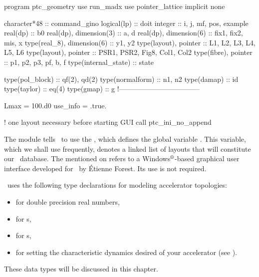 \begin{ptccode}[
  label={\ptctitle{\ptc{ptc_geometry.f90}\quad\small This program
                   describes the geometry of several \PTC\ lattices.}}
]
program ptc_geometry
use run_madx
use pointer_lattice
implicit none

character*48 :: command_gino    \label{lin:gino}
logical(lp) :: doit
integer :: i, j, mf, pos, example
real(dp) :: b0
real(dp), dimension(3) :: a, d  \label{lin:decl.ad}
real(dp), dimension(6) :: fix1, fix2, mis, x
type(real_8), dimension(6) :: y1, y2
type(layout), pointer :: L1, L2, L3, L4, L5, L6
type(layout), pointer :: PSR1, PSR2, Fig8, Col1, Col2
type(fibre), pointer :: p1, p2, p3, pf, b, f
type(internal_state) :: state

type(pol_block) :: qf(2), qd(2)
type(normalform) :: n1, n2
type(damap) :: id
type(taylor) :: eq(4)
type(gmap) :: g
!-----------------------------------

Lmax = 100.d0
use_info = .true.

! one layout necessary before starting GUI
call ptc_ini_no_append          \label{lin:init.layout}
\end{ptccode}


%
The module  tells \PTC\ to use the
, which defines the global variable
.\label{mad.univ}%
This variable, which we shall use frequently, denotes a linked list
of layouts%
that will constitute our \DNA\ database. The 
mentioned on  refers to a
Windows$^\text{\textregistered}$-based graphical user
interface developed for \PTC\ by \'Etienne Forest.
Its use is not required.

\PTC\ uses the following type declarations for modeling accelerator
topologies:
\begin{itemize}
  \item {} for double precision real numbers,
  \item {} for s,
  \item {} for s,
  \item {} for setting the characteristic
         dynamics desired of your accelerator (see ).
\end{itemize}
These data types will be discussed in this chapter.

